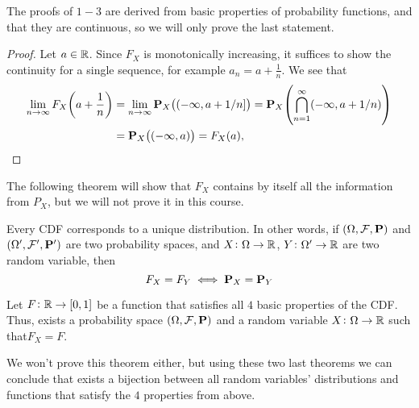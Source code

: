 \documentclass[11pt,a4paper]{article}
\begin{document}
  The proofs of $1-3$ are derived from basic properties of probability
  functions, and that they are continuous, so we will only prove the last
  statement.
  \begin{proof}
    Let $a \in \mathbb{R}$.
    Since $F_X$ is monotonically increasing, it suffices to show the continuity
    for a single sequence, for example $a_n = a + \frac{1}{n}$. We see
    that
    \begin{align*}
      \lim_{n\to\infty} F_{X} {\left(a+\frac{1}{n}\right)} &=
      \lim_{n\to\infty} \mathbf{P}_{X}{\left((-\infty,a+1/n]\right)} =
      \mathbf{P}_{X}{\left(\bigcap_{n=1}^{\infty}(-\infty,a+1/n)\right)} \\ &=
      \mathbf{P}_{X}{\left((-\infty,a)\right)} =
      F_{X}(a),
    \end{align*}
  \end{proof}
  The following theorem will show that $F_X$ contains by itself all the
  information from $P_X$, but we will not prove it in this course.
  \begin{theorem}\label{thm:FcharacterizesP}
    Every CDF corresponds to a unique distribution. In other words, if
    $(\Omega, \mathcal F, \mathbf{P})$ and $(\Omega', \mathcal F', \mathbf{P}')$
    are two probability spaces, and $X \colon \Omega \to \mathbb{R}$, 
    $Y \colon \Omega' \to \mathbb{R}$ are two random variable, then
    \[
      F_X = F_Y \iff \mathbf{P}_X = \mathbf{P}_Y
    \]
  \end{theorem}
  \begin{theorem}
    Let $F \colon \mathbb{R} \to [0,1]$ be a function that satisfies all $4$ basic
    properties of the CDF. Thus, exists a probability space 
    $(\Omega, \mathcal F, \mathbf{P})$ and a random variable 
    $X \colon \Omega \to \mathbb{R}$ such that$F_X = F$.
  \end{theorem}
  We won't prove this theorem either, but using these two last theorems
  we can conclude that exists a bijection between all random variables'
  distributions and functions that satisfy the $4$ properties from above.
\end{document}
